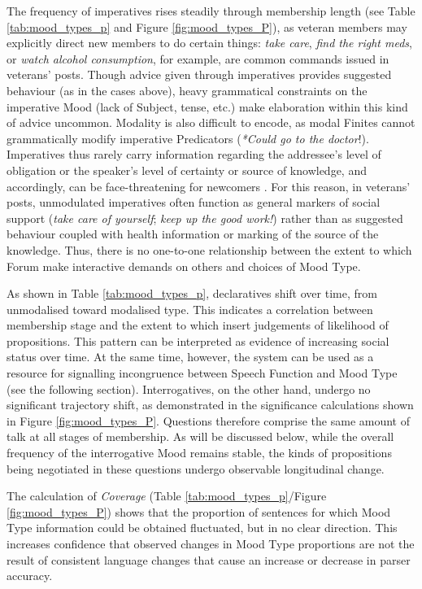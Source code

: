 The frequency of imperatives rises steadily through membership length (see Table \ref{tab:mood_types_p} and Figure \ref{fig:mood_types_P}), as veteran \glspl{member} may explicitly direct new \glspl{member} to do certain things: \emph{take care}, \emph{find the right meds}, or \emph{watch alcohol consumption}, for example, are common commands issued in veterans' \glspl{post}. Though advice given through imperatives provides suggested behaviour (as in the cases above), heavy grammatical constraints on the imperative Mood (lack of Subject, tense, etc.) make elaboration within this kind of advice uncommon. Modality is also difficult to encode, as modal Finites cannot grammatically modify imperative Predicators (\emph{*Could go to the doctor}!). Imperatives thus rarely carry information regarding the addressee's level of obligation or the speaker's level of certainty or source of knowledge, and accordingly, can be face\hyp{}threatening for newcomers \cite{goldsmith2004communicating,hudson1990discourse}. For this reason, in veterans' \glspl{post}, unmodulated imperatives often function as general markers of social support (\emph{take care of yourself}; \emph{keep up the good work!}) rather than as suggested behaviour coupled with health information or marking of the source of the knowledge. Thus, there is no one-to-one relationship between the extent to which \gls{Forum}  make interactive demands on others and choices of Mood Type.

As shown in Table \ref{tab:mood_types_p}, declaratives shift over time, from unmodalised toward modalised type. This indicates a correlation between membership stage and the extent to which  insert judgements of likelihood of propositions. This pattern can be interpreted as evidence of increasing social status over time. At the same time, however, the  system can be used as a resource for signalling incongruence between Speech Function and Mood Type (see the following section). Interrogatives, on the other hand, undergo no significant trajectory shift, as demonstrated in the significance calculations shown in Figure \ref{fig:mood_types_P}. Questions therefore comprise the same amount of talk at all stages of membership. As will be discussed below, while the overall frequency of the interrogative Mood remains stable, the kinds of propositions being negotiated in these questions undergo observable longitudinal change.

The calculation of \emph{Coverage} (Table \ref{tab:mood_types_p}\slash Figure \ref{fig:mood_types_P}) shows that the proportion of sentences for which Mood Type information could be obtained fluctuated, but in no clear direction. This increases confidence that observed changes in Mood Type proportions are not the result of consistent language changes that cause an increase or decrease in parser accuracy.

